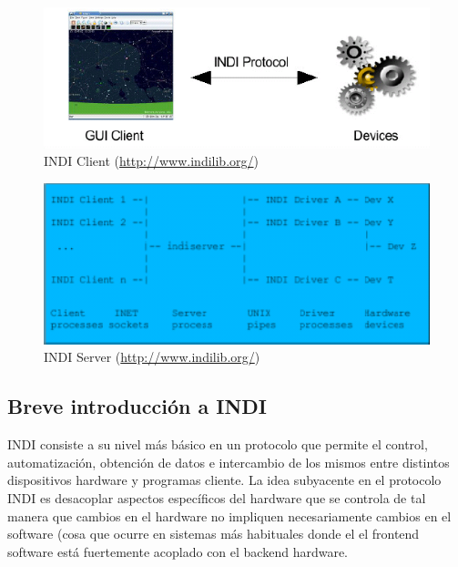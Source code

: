 \bigskip
\begin{figure}[!ht]
  \begin{center}
    \includegraphics[width=1\textwidth]{../images/Indi_client.png}
    \caption[INDI Client]{INDI Client (\href{http://www.indilib.org/}{http://www.indilib.org/})}
    \label{fig:indi_client}
  \end{center}
\end{figure}

\bigskip
\begin{figure}[!ht]
  \begin{center}
    \includegraphics[width=1\textwidth]{../images/Indi_server.png}
    \caption[INDI Server]{INDI Server (\href{http://www.indilib.org/}{http://www.indilib.org/})}
    \label{fig:indi_server}
  \end{center}
\end{figure}

\bigskip

\subsection{Breve introducción a INDI}

INDI consiste a su nivel más básico en un protocolo que permite el control, automatización, obtención de datos e intercambio de los mismos entre distintos dispositivos hardware y programas cliente. La idea subyacente en el protocolo INDI es desacoplar aspectos específicos del hardware que se controla de tal manera que cambios en el hardware no impliquen necesariamente cambios en el software (cosa que ocurre en sistemas más habituales donde el el frontend software está fuertemente acoplado con el backend hardware.

